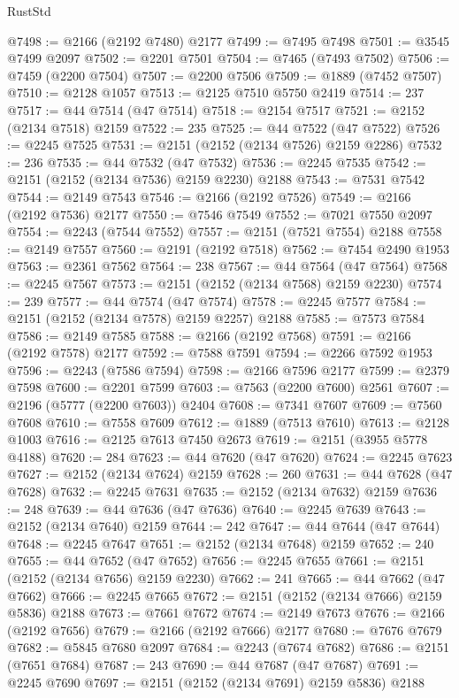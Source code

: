 \begin{lexlean}{RustStd}
\begin{coremodule}
@7498 := @2166 (@2192 @7480) @2177
@7499 := @7495 @7498
@7501 := @3545 @7499 @2097
@7502 := @2201 @7501
@7504 := @7465 (@7493 @7502)
@7506 := @7459 (@2200 @7504)
@7507 := @2200 @7506
@7509 := @1889 (@7452 @7507)
@7510 := @2128 @1057
@7513 := @2125 @7510 @5750 @2419
@7514 := 237
@7517 := @44 @7514 (@47 @7514)
@7518 := @2154 @7517
@7521 := @2152 (@2134 @7518) @2159
@7522 := 235
@7525 := @44 @7522 (@47 @7522)
@7526 := @2245 @7525
@7531 := @2151 (@2152 (@2134 @7526) @2159 @2286)
@7532 := 236
@7535 := @44 @7532 (@47 @7532)
@7536 := @2245 @7535
@7542 := @2151 (@2152 (@2134 @7536) @2159 @2230) @2188
@7543 := @7531 @7542
@7544 := @2149 @7543
@7546 := @2166 (@2192 @7526)
@7549 := @2166 (@2192 @7536) @2177
@7550 := @7546 @7549
@7552 := @7021 @7550 @2097
@7554 := @2243 (@7544 @7552)
@7557 := @2151 (@7521 @7554) @2188
@7558 := @2149 @7557
@7560 := @2191 (@2192 @7518)
@7562 := @7454 @2490 @1953
@7563 := @2361 @7562
@7564 := 238
@7567 := @44 @7564 (@47 @7564)
@7568 := @2245 @7567
@7573 := @2151 (@2152 (@2134 @7568) @2159 @2230)
@7574 := 239
@7577 := @44 @7574 (@47 @7574)
@7578 := @2245 @7577
@7584 := @2151 (@2152 (@2134 @7578) @2159 @2257) @2188
@7585 := @7573 @7584
@7586 := @2149 @7585
@7588 := @2166 (@2192 @7568)
@7591 := @2166 (@2192 @7578) @2177
@7592 := @7588 @7591
@7594 := @2266 @7592 @1953
@7596 := @2243 (@7586 @7594)
@7598 := @2166 @7596 @2177
@7599 := @2379 @7598
@7600 := @2201 @7599
@7603 := @7563 (@2200 @7600) @2561
@7607 := @2196 (@5777 (@2200 @7603)) @2404
@7608 := @7341 @7607
@7609 := @7560 @7608
@7610 := @7558 @7609
@7612 := @1889 (@7513 @7610)
@7613 := @2128 @1003
@7616 := @2125 @7613 @7450 @2673
@7619 := @2151 (@3955 @5778 @4188)
@7620 := 284
@7623 := @44 @7620 (@47 @7620)
@7624 := @2245 @7623
@7627 := @2152 (@2134 @7624) @2159
@7628 := 260
@7631 := @44 @7628 (@47 @7628)
@7632 := @2245 @7631
@7635 := @2152 (@2134 @7632) @2159
@7636 := 248
@7639 := @44 @7636 (@47 @7636)
@7640 := @2245 @7639
@7643 := @2152 (@2134 @7640) @2159
@7644 := 242
@7647 := @44 @7644 (@47 @7644)
@7648 := @2245 @7647
@7651 := @2152 (@2134 @7648) @2159
@7652 := 240
@7655 := @44 @7652 (@47 @7652)
@7656 := @2245 @7655
@7661 := @2151 (@2152 (@2134 @7656) @2159 @2230)
@7662 := 241
@7665 := @44 @7662 (@47 @7662)
@7666 := @2245 @7665
@7672 := @2151 (@2152 (@2134 @7666) @2159 @5836) @2188
@7673 := @7661 @7672
@7674 := @2149 @7673
@7676 := @2166 (@2192 @7656)
@7679 := @2166 (@2192 @7666) @2177
@7680 := @7676 @7679
@7682 := @5845 @7680 @2097
@7684 := @2243 (@7674 @7682)
@7686 := @2151 (@7651 @7684)
@7687 := 243
@7690 := @44 @7687 (@47 @7687)
@7691 := @2245 @7690
@7697 := @2151 (@2152 (@2134 @7691) @2159 @5836) @2188

\end{coremodule}
\end{lexlean}
